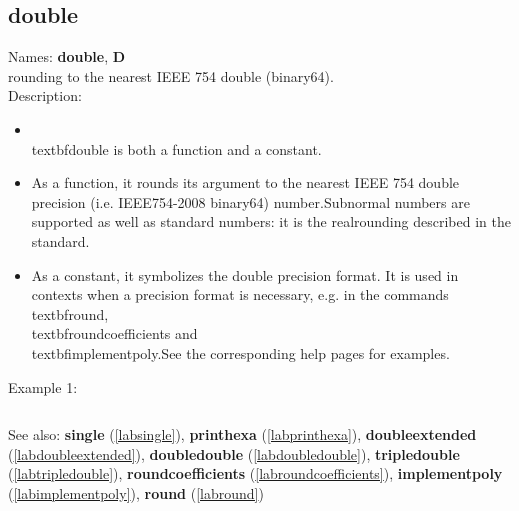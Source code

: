 \subsection{double}
\label{labdouble}
\noindent Names: \textbf{double}, \textbf{D}\\
rounding to the nearest IEEE 754 double (binary64).\\
\noindent Description: \begin{itemize}

\item \\textbf{double} is both a function and a constant.\n
\item As a function, it rounds its argument to the nearest IEEE 754 double precision (i.e. IEEE754-2008 binary64) number.\n   Subnormal numbers are supported as well as standard numbers: it is the real\n   rounding described in the standard.\n
\item As a constant, it symbolizes the double precision format. It is used in \n   contexts when a precision format is necessary, e.g. in the commands \n   \\textbf{round}, \\textbf{roundcoefficients} and \\textbf{implementpoly}.\n   See the corresponding help pages for examples.\n\end{itemize}
\noindent Example 1: 
\begin{center}\begin{minipage}{15cm}\begin{Verbatim}[frame=single]
\end{Verbatim}
\end{minipage}\end{center}
See also: \textbf{single} (\ref{labsingle}), \textbf{printhexa} (\ref{labprinthexa}), \textbf{doubleextended} (\ref{labdoubleextended}), \textbf{doubledouble} (\ref{labdoubledouble}), \textbf{tripledouble} (\ref{labtripledouble}), \textbf{roundcoefficients} (\ref{labroundcoefficients}), \textbf{implementpoly} (\ref{labimplementpoly}), \textbf{round} (\ref{labround})

